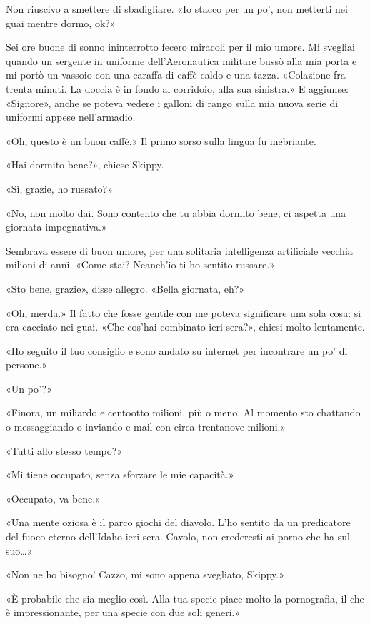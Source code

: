 Non riuscivo a smettere di sbadigliare. «Io stacco per un po', non
metterti nei guai mentre dormo, ok?»

\hfill\break

Sei ore buone di sonno ininterrotto fecero miracoli per il mio umore. Mi
svegliai quando un sergente in uniforme dell'Aeronautica militare bussò
alla mia porta e mi portò un vassoio con una caraffa di caffè caldo e
una tazza. «Colazione fra trenta minuti. La doccia è in fondo al
corridoio, alla sua sinistra.» E aggiunse: «Signore», anche se poteva
vedere i galloni di rango sulla mia nuova serie di uniformi appese
nell'armadio.

«Oh, questo è un buon caffè.» Il primo sorso sulla lingua fu inebriante.

«Hai dormito bene?», chiese Skippy.

«Sì, grazie, ho russato?»

«No, non molto dai. Sono contento che tu abbia dormito bene, ci aspetta
una giornata impegnativa.»

Sembrava essere di buon umore, per una solitaria intelligenza
artificiale vecchia milioni di anni. «Come stai? Neanch'io ti ho sentito
russare.»

«Sto bene, grazie», disse allegro. «Bella giornata, eh?»

«Oh, merda.» Il fatto che fosse gentile con me poteva significare una
sola cosa: si era cacciato nei guai. «Che cos'hai combinato ieri sera?»,
chiesi molto lentamente.

«Ho seguito il tuo consiglio e sono andato su internet per incontrare un
po' di persone.»

«Un po'?»

«Finora, un miliardo e centootto milioni, più o meno. Al momento sto
chattando o messaggiando o inviando e-mail con circa trentanove
milioni.»

«Tutti allo stesso tempo?»

«Mi tiene occupato, senza sforzare le mie capacità.»

«Occupato, va bene.»

«Una mente oziosa è il parco giochi del diavolo. L'ho sentito da un
predicatore del fuoco eterno dell'Idaho ieri sera. Cavolo, non
crederesti ai porno che ha sul suo\ldots»

«Non ne ho bisogno! Cazzo, mi sono appena svegliato, Skippy.»

«È probabile che sia meglio così. Alla tua specie piace molto la
pornografia, il che è impressionante, per una specie con due soli
generi.»

